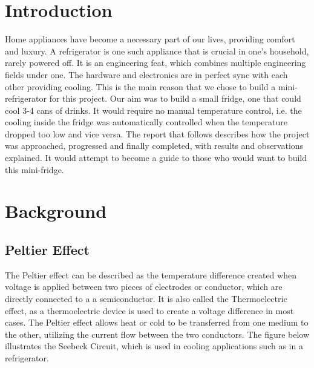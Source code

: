 \documentclass[12pt,a4paper]{report}
\begin{document}

\tableofcontents


\quad 
\setcounter{page}{1}
\chapter{Introduction}
Home appliances have become a necessary part of our lives, providing comfort and luxury. A refrigerator is one such appliance that is crucial in one's household, rarely powered off. It is an engineering feat, which combines multiple engineering fields under one. The hardware and electronics are in perfect sync with each other providing cooling. This is the main reason that we chose to build a mini-refrigerator for this project. Our aim was to build a small fridge, one that could cool 3-4 cans of drinks. It would require no manual temperature control, i.e. the cooling inside the fridge was automatically controlled when the temperature dropped too low and vice versa. The report that follows describes how the project was approached, progressed and finally completed, with results and observations explained. It would attempt to become a guide to those who would want to build this mini-fridge. 

\chapter{Background}
\section{Peltier Effect}
The Peltier effect can be described as the temperature difference created when voltage is applied between two pieces of electrodes or conductor, which are directly connected to a a semiconductor. It is also called the Thermoelectric effect, as a thermoelectric device is used to create a voltage difference in most cases. The Peltier effect allows heat or cold to be transferred from one medium to the other, utilizing the current flow between the two conductors. The figure below illustrates the Seebeck Circuit, which is used in cooling applications such as in a refrigerator. 
\end{document}

